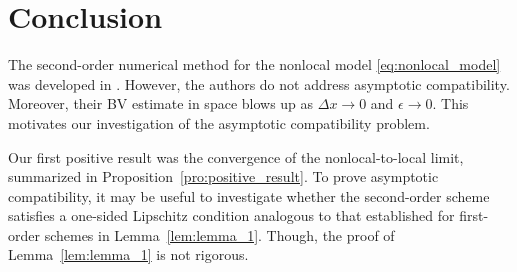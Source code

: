 \section{Conclusion}

The second-order numerical method for the nonlocal model \eqref{eq:nonlocal_model} was developed in \cite{gowdag.d.ConvergenceSecondorderScheme2023}. However, the authors do not address asymptotic compatibility. Moreover, their BV estimate in space blows up as \(\Delta x \to 0\) and \(\epsilon \to 0\). This motivates our investigation of the asymptotic compatibility problem.

Our first positive result was the convergence of the nonlocal-to-local limit, summarized in Proposition~\ref{pro:positive_result}. To prove asymptotic compatibility, it may be useful to investigate whether the second-order scheme satisfies a one-sided Lipschitz condition analogous to that established for first-order schemes in Lemma~\ref{lem:lemma_1}. Though, the proof of Lemma~\ref{lem:lemma_1} is not rigorous.
